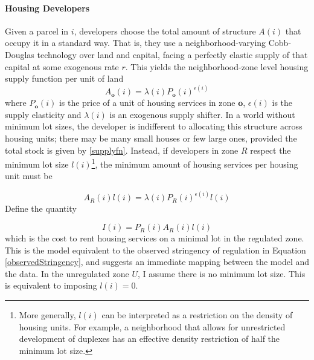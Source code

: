 \documentclass[12pt]{article}
\begin{document}
	\paragraph*{Housing Developers}  Given a parcel in $i$, developers choose the total amount of structure $A(i)$ that occupy it in a standard way. That is, they use a neighborhood-varying Cobb-Douglas technology over land and capital, facing a perfectly elastic supply of that capital at some exogenous rate $r$. This yields the neighborhood-zone level housing supply function per unit of land
	\begin{equation}\label{supplyfn}
		A_{\boldsymbol{o}}(i) = \lambda(i)P_{\boldsymbol{o}}(i)^{\epsilon(i)}
	\end{equation}
	where $P_{\boldsymbol{o}}(i)$ is the price of a unit of housing services in zone $\boldsymbol{o}$, $\epsilon(i)$ is the supply elasticity and $\lambda(i)$ is an exogenous supply shifter. In a world without minimum lot sizes, the developer is indifferent to allocating this structure across housing units; there may be many small houses or few large ones, provided the total stock is given by \eqref{supplyfn}. Instead, if developers in zone $R$ respect the minimum lot size $l(i)$\footnote{More generally, $l(i)$ can be interpreted as a restriction on the density of housing units. For example, a neighborhood that allows for unrestricted development of duplexes has an effective density restriction of half the minimum lot size.}, the minimum amount of housing services per housing unit must be

	\begin{equation}\label{minstructure}
		A_{R}(i)l(i) = \lambda(i)P_{R}(i)^{\epsilon(i)}l(i)
	\end{equation}
	Define the quantity 
	
	\begin{equation}\label{stringency}
		I(i) = P_{R}(i)A_{R}(i)l(i)
	\end{equation}
	which is the cost to rent housing services on a minimal lot in the regulated zone. This is the model equivalent to the observed stringency of regulation in Equation \eqref{observedStringency}, and suggests an immediate mapping between the model and the data. In the unregulated zone $U$, I assume there is no minimum lot size. This is equivalent to imposing $l(i) = 0$. 
	
\end{document}
